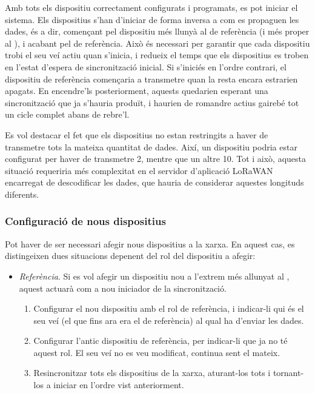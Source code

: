 \documentclass{tfgitic}[2024/07/01]
\begin{document}
{Amb tots els dispositiu correctament configurats i programats, es pot iniciar el sistema. Els dispositius s'han d'iniciar de forma inversa a com es propaguen les dades, és a dir, començant pel dispositiu més llunyà al de referència (i més proper al ), i acabant pel de referència. Això és necessari per garantir que cada dispositiu trobi el seu veí actiu quan s'inicia, i redueix el temps que els dispositius es troben en l'estat d'espera de sincronització inicial. Si s'iniciés en l'ordre contrari, el dispositiu de referència començaria a transmetre quan la resta encara estrarien apagats. En encendre'ls posteriorment, aquests quedarien esperant una sincronització que ja s'hauria produït, i haurien de romandre actius gairebé tot un cicle complet abans de rebre'l.

Es vol destacar el fet que els dispositius no estan restringits a haver de transmetre tots la mateixa quantitat de dades. Així, un dispositiu podria estar configurat per haver de transmetre \SI{2}{\byte}, mentre que un altre \SI{10}{\byte}. Tot i això, aquesta situació requeriria més complexitat en el servidor d'aplicació LoRaWAN encarregat de descodificar les dades, que hauria de considerar aquestes longituds diferents. 

\subsubsection{Configuració de nous dispositius}
Pot haver de ser necessari afegir nous dispositius a la xarxa. En aquest cas, es distingeixen dues situacions depenent del rol del dispositiu a afegir:
\begin{itemize}
    \item \emph{Referència}. Si es vol afegir un dispositiu nou a l'extrem més allunyat al , aquest actuarà com a nou iniciador de la sincronització. 
    \begin{enumerate}
        \item Configurar el nou dispositiu amb el rol de referència, i indicar-li qui és el seu veí (el que fins ara era el de referència) al qual ha d'enviar les dades.
        \item Configurar l'antic dispositiu de referència, per indicar-li que ja no té aquest rol. El seu veí no es veu modificat, continua sent el mateix.
        \item Resincronitzar tots els dispositius de la xarxa, aturant-los tots i tornant-los a iniciar en l'ordre vist anteriorment.
    \end{enumerate}


\end{itemize}}
\end{document}
